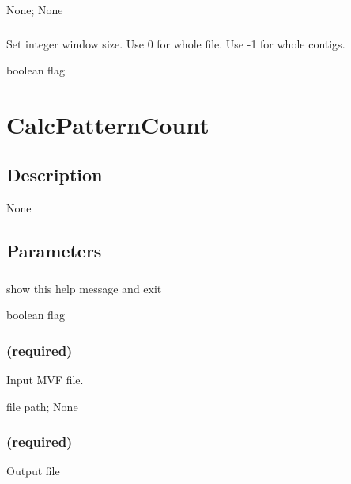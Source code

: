 \documentclass[letterpaper,11pt,english]{sphinxmanual}
\begin{document}
 None;  None


\subsubsection{}
\label{\detokenize{prog_desc:id72}}
 Set integer window size. Use 0 for whole file. Use -1 for whole contigs.

 boolean flag


\section{CalcPatternCount}
\label{\detokenize{prog_desc:calcpatterncount}}

\subsection{Description}
\label{\detokenize{prog_desc:id73}}
None


\subsection{Parameters}
\label{\detokenize{prog_desc:id74}}

\subsubsection{}
\label{\detokenize{prog_desc:id75}}
 show this help message and exit

 boolean flag


\subsubsection{ (required)}
\label{\detokenize{prog_desc:id76}}
 Input MVF file.

 file path;  None


\subsubsection{ (required)}
\label{\detokenize{prog_desc:id77}}
 Output file
\end{document}
